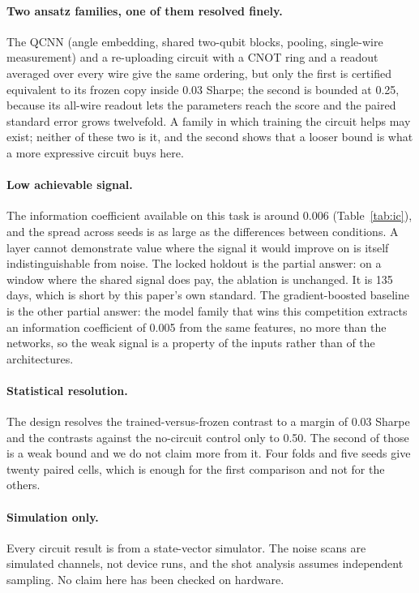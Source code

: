 \paragraph{Two ansatz families, one of them resolved finely.}
The QCNN (angle embedding, shared two-qubit blocks, pooling, single-wire
measurement) and a re-uploading circuit with a CNOT ring and a readout
averaged over every wire give the same ordering, but only the first is certified equivalent
to its frozen copy inside \num{0.03} Sharpe; the second is bounded at
\num{0.25}, because its all-wire readout lets the parameters reach the
score and the paired standard error grows twelvefold. A family in which
training the circuit helps may exist; neither of these two is it, and the
second shows that a looser bound is what a more expressive circuit buys here.

\paragraph{Low achievable signal.}
The information coefficient available on this task is around \num{0.006}
(Table~\ref{tab:ic}), and the spread across seeds is as large as the
differences between conditions. A layer cannot demonstrate value where the signal
it would improve on is itself indistinguishable from noise. The locked holdout
is the partial answer: on a window where the shared signal does pay, the
ablation is unchanged. It is \num{135} days, which is short by this paper's own
standard. The gradient-boosted baseline is the other partial answer: the model
family that wins this competition extracts an information coefficient of
\num{0.005} from the same features, no more than the networks, so the weak
signal is a property of the inputs rather than of the architectures.

\paragraph{Statistical resolution.}
The design resolves the trained-versus-frozen contrast to a margin of
\num{0.03} Sharpe and the contrasts against the no-circuit control only to
\num{0.50}. The second of those is a weak bound and we do not claim more from
it. Four folds and five seeds give twenty paired cells, which is enough for the
first comparison and not for the others.

\paragraph{Simulation only.}
Every circuit result is from a state-vector simulator. The noise scans are
simulated channels, not device runs, and the shot analysis assumes independent
sampling. No claim here has been checked on hardware.

